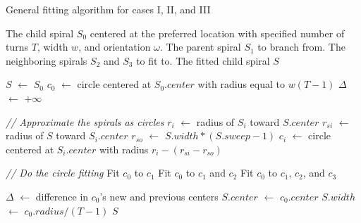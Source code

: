 \begin{algorithm*}
\caption{General fitting algorithm for cases I, II, and III}
\label{alg:fitting}
\begin{algorithmic}
	\Require The child spiral $S_{0}$ centered at the preferred location with specified 
		      	number of turns $T$, width $w$, and orientation $\omega$.
	\Require The parent spiral $S_{1}$ to branch from.
	\Require The neighboring spirals $S_{2}$ and $S_{3}$ to fit to.
	\Ensure The fitted child spiral $S$
    	
		\State $S$ $\gets$ $S_{0}$
		\State $c_{0}$ $\gets$ circle centered at $S_{0}.center$ with
	         \State \hskip 10mm     radius equal to $w(T-1)$
	         \State $\Delta$ $\gets$ $+\infty$
	         \State
		         
	         \Repeat
		        	\State \textit{// Approximate the spirals as circles}
				\State $r_{i}$ $\gets$ radius of $S_{i}$ toward $S.center$
				\State $r_{si}$ $\gets$ radius of $S$ toward $S_{i}.center$
				\State $r_{so}$ $\gets$ $S.width * (S.sweep - 1)$
				\State $c_{i}$ $\gets$ circle centered at $S_{i}.center$ with radius $r_{i} - (r_{si} - r_{so})$
			\EndFor
			\State
				
			\State \textit{// Do the circle fitting}
				\State Fit $c_{0}$ to $c_{1}$ 
			\EndIf
				\State Fit $c_{0}$ to $c_{1}$ and $c_{2}$ 
			\EndIf
				\State Fit $c_{0}$ to $c_{1}$, $c_{2}$, and $c_{3}$ 
			\EndIf
				
			\State
			\State $\Delta$ $\gets$ difference in $c_{0}$'s new and previous centers
			\State $S.center$ $\gets$ $c_{0}.center$
			\State $S.width$ $\gets$ $c_{0}.radius/(T-1)$
		\State \Return $S$
	\EndFunction
\end{algorithmic}
\end{algorithm*}
